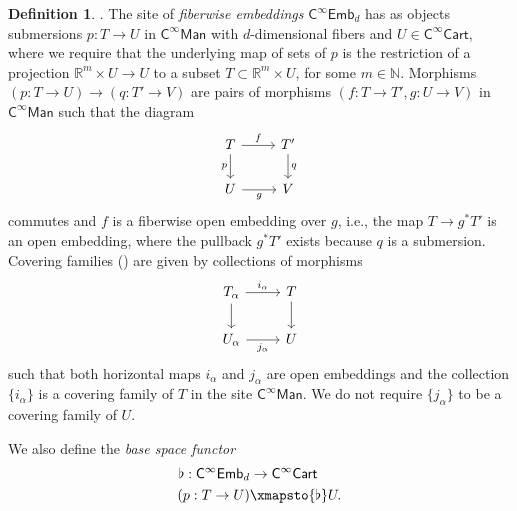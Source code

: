 \documentclass{amsart}
\newcommand{\cat}[1]{\mathsf{#1}}
\newcommand{\Cart}{\cat{C}^{\infty}\cat{Cart}}
\newcommand{\Man}{\cat{C}^{\infty}\cat{Man}}
\newcommand{\fembnoniso}[1]{\cat{C}^{\infty}\cat{Emb}_{#1}}
\newcommand{\ra}{\rightarrow}
\newcommand{\RR}{{\mathbb{R}}}
\newcommand{\NN}{{\mathbb{N}}}
\theoremstyle{definition}
\newtheorem{definition}[equation]{Definition}
\numberwithin{equation}{subsection}
\numberwithin{subsubsection}{subsection}
\begin{document}
\begin{definition}\label{def:fembnoniso}
  \textnormal{\cite[Definition~4.2.1]{GP26}}.
  The site of \emph{fiberwise embeddings} \(
  \fembnoniso{d} \) has as objects submersions
  \( p: T \ra U \) in \( \Man \) with \( d \)-dimensional fibers
  and \( U\in \Cart \), where we require that the underlying map of
  sets of \( p
  \) is the restriction of a projection \( \RR^{m}\times U \ra U \)
  to a subset
  \( T\subset \RR^{m}\times U \), for some \( m \in \NN\).
  Morphisms \( (p: T \ra U) \ra (q: T' \ra V) \) are pairs of morphisms
  \( ( f: T \ra T', g: U \ra V ) \) in \( \Man \) such that the diagram
  \[
    \begin{tikzcd}
      T & T' \\
      U & V
      \arrow["f", from=1-1, to=1-2]
      \arrow["p"', from=1-1, to=2-1]
      \arrow["q", from=1-2, to=2-2]
      \arrow["g"', from=2-1, to=2-2]
  \end{tikzcd}\]
  commutes and \( f \) is a fiberwise open embedding over \( g \),
  i.e.,  the map \( T \ra g^{*}T' \) is an open embedding, where
  the pullback \(
  g^{*}T' \) exists because \( q \) is a submersion. Covering
  families () are given
  by collections of morphisms
  \[
    \begin{tikzcd}
      {T_{\alpha}} & T \\
      {U_{\alpha}} & U
      \arrow["{i_{\alpha}}", from=1-1, to=1-2]
      \arrow[from=1-1, to=2-1]
      \arrow[from=1-2, to=2-2]
      \arrow["{j_{\alpha}}"', from=2-1, to=2-2]
  \end{tikzcd}\]
  such that both horizontal maps \( i_{\alpha} \) and \( j_{\alpha}
  \) are open
  embeddings and the collection \( \{i_{\alpha}\} \) is a covering
  family of \( T \) in the site \( \Man \). We do not require \(
  \{j_{\alpha}\} \) to be a covering family of \( U \).

  We also define the \emph{base space functor}
  \begin{align*}
    \flat: \fembnoniso{d} &\ra \Cart \\
    (p: T\ra U) & \xmapsto{\flat} U.
  \end{align*}
\end{definition}
\end{document}
